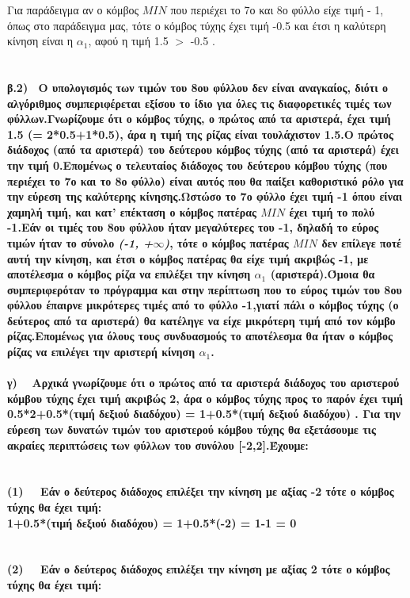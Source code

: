 \documentclass[10pt]{article}
\begin{document}
Για παράδειγμα αν ο κόμβος $MIN$ που περιέχει το 7ο και 8ο φύλλο είχε τιμή - 1, όπως στο παράδειγμα μας, τότε ο κόμβος τύχης  έχει τιμή -0.5 και έτσι η καλύτερη κίνηση είναι  η $α_{1}$, αφού η τιμή 1.5 $>$ -0.5 . \\ \\ \\
\bf β.2) \ \normalfont Ο υπολογισμός των τιμών του 8ου φύλλου δεν είναι αναγκαίος, διότι ο αλγόριθμος συμπεριφέρεται εξίσου το ίδιο για όλες τις διαφορετικές τιμές των φύλλων.Γνωρίζουμε ότι ο κόμβος τύχης, ο πρώτος από τα αριστερά, έχει τιμή 1.5 (= 2*0.5+1*0.5), άρα η τιμή της ρίζας είναι τουλάχιστον 1.5.Ο πρώτος διάδοχος (από τα αριστερά) του δεύτερου κόμβος τύχης (από τα αριστερά) έχει την τιμή 0.Επομένως ο τελευταίος διάδοχος του δεύτερου κόμβου τύχης (που περιέχει το 7ο και το 8ο φύλλο) είναι αυτός που θα παίξει καθοριστικό ρόλο για την εύρεση της καλύτερης κίνησης.Ωστώσο το 7ο φύλλο έχει τιμή -1 όπου είναι χαμηλή τιμή, και κατ’ επέκταση ο κόμβος πατέρας  $MIN$ έχει τιμή το πολύ -1.Εάν οι τιμές του 8ου φύλλου ήταν μεγαλύτερες του -1, δηλαδή το εύρος τιμών ήταν το σύνολο \textit{(-1, +$\infty$)}, τότε ο κόμβος πατέρας $MIN$ δεν επίλεγε ποτέ αυτή την κίνηση, και έτσι ο κόμβος πατέρας θα είχε τιμή ακριβώς -1, με αποτέλεσμα ο κόμβος ρίζα να επιλέξει την κίνηση $α_{1}$ (αριστερά).Όμοια θα συμπεριφερόταν το πρόγραμμα και στην περίπτωση που το εύρος τιμών του 8ου φύλλου έπαιρνε μικρότερες τιμές από το φύλλο -1,γιατί πάλι ο κόμβος τύχης (ο δεύτερος από τα αριστερά) θα κατέληγε να είχε μικρότερη τιμή από τον κόμβο ρίζας.Επομένως για όλους τους συνδυασμούς το αποτέλεσμα θα ήταν ο κόμβος ρίζας να επιλέγει την αριστερή κίνηση $α_{1}$.  \\ \\ 
\bf γ) \ \normalfont 
Αρχικά γνωρίζουμε ότι ο πρώτος από τα αριστερά διάδοχος του αριστερού κόμβου τύχης έχει τιμή ακριβώς 2, άρα ο κόμβος τύχης προς το παρόν έχει τιμή 0.5*2+0.5*(τιμή δεξιού διαδόχου) = 1+0.5*(τιμή δεξιού διαδόχου) . Για την εύρεση των δυνατών τιμών του αριστερού κόμβου τύχης θα εξετάσουμε τις ακραίες περιπτώσεις των φύλλων του συνόλου [-2,2].Έχουμε: \\ \\ \\
(\textbf{1}) \ \ Εάν ο δεύτερος διάδοχος επιλέξει την κίνηση με αξίας -2 τότε ο κόμβος τύχης θα έχει τιμή: \\

 \hspace{30mm} 1+0.5*(τιμή δεξιού διαδόχου) = 1+0.5*(-2) = 1-1 = 0  \\ \\ \\
(\textbf{2}) \ \
Εάν ο δεύτερος διάδοχος επιλέξει την κίνηση με αξίας 2 τότε ο κόμβος τύχης θα έχει τιμή:\\
\end{document}
